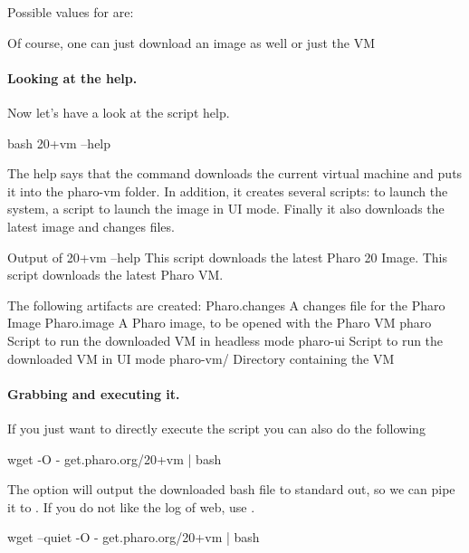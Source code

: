 \documentclass[a4paper,10pt,twoside]{book}
\begin{document}
Possible values for  are: 

Of course, one can just download an image as well  or just the VM 



\paragraph{Looking at the help.}
Now let's have a look at the script help.

\begin{code}{}
bash 20+vm --help 
\end{code}

The help says that the  command downloads the current virtual machine and puts it into the pharo-vm folder. In addition, it creates several scripts:  to launch the system,  a script to launch the image in UI mode. Finally it also downloads the latest image and changes files.

\begin{code}{Output of 20+vm --help }
This script downloads the latest Pharo 20 Image.
This script downloads the latest Pharo VM.

The following artifacts are created:
    Pharo.changes  A changes file for the Pharo Image
    Pharo.image    A Pharo image, to be opened with the Pharo VM
    pharo          Script to run the downloaded VM in headless mode
    pharo-ui       Script to run the downloaded VM in UI mode
    pharo-vm/      Directory containing the VM
\end{code}



\paragraph{Grabbing and executing it.}
If you just want to directly execute the script you can also do the following

\begin{code}{}
wget -O - get.pharo.org/20+vm | bash
\end{code}

The option  will output the downloaded bash file to standard out, so we can pipe it to \mbox{.} If you do not like the log of web, use  .

\begin{code}{}
wget --quiet -O - get.pharo.org/20+vm | bash
\end{code}
\end{document}
